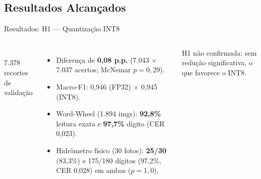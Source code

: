 \documentclass[
    aspectratio=169,
    11pt,
    brazil
]{beamer}
\begin{document}
\subsection{Resultados Alcançados}
\begin{frame}{Resultados: H1 --- Quantização INT8}
  \begin{columns}[c]
    \centering
    \\
    {\tiny 7.378 recortes de validação}
    \begin{itemize}\scriptsize
      \item Diferença de \textbf{0,08 p.p.} (7.043 $\times$ 7.037 acertos; McNemar $p = 0{,}29$).
      \item Macro-F1: 0,946 (FP32) $\times$ 0,945 (INT8).
      \item Word-Wheel (1.894 imgs): \textbf{92,8\%} leitura exata e \textbf{97,7\%} dígito (CER 0,023).
      \item Hidrômetro físico (30 fotos): \textbf{25/30} (83,3\%) e 175/180 dígitos (97,2\%, CER 0,028) em ambas ($p = 1{,}0$).
    \end{itemize}
    \vspace{0.1cm}
    {\scriptsize H1 não confirmada: sem redução significativa, o que favorece o INT8.}
  \end{columns}
\end{frame}
\end{document}
